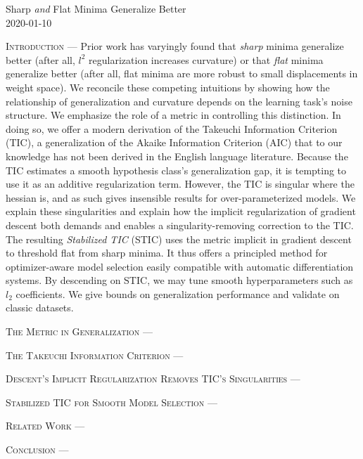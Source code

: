 \documentclass{article}
\begin{document}
    \begin{center}
        \Large
        Sharp \emph{and} Flat Minima Generalize Better
        \\
        \large
        2020-01-10
    \end{center}

    \textsc{Introduction} ---
    Prior work has varyingly found that \emph{sharp} minima generalize better
    (after all, $l^2$ regularization increases curvature) or that \emph{flat}
    minima generalize better (after all, flat minima are more robust to small
    displacements in weight space).  We reconcile these competing intuitions by
    showing how the relationship of generalization and curvature depends on the
    learning task's noise structure.  We emphasize the role of a metric in
    controlling this distinction.  In doing so, we offer a modern derivation of
    the Takeuchi Information Criterion (TIC), a generalization of the Akaike
    Information Criterion (AIC) that to our knowledge has not been derived in
    the English language literature.  Because the TIC estimates a smooth
    hypothesis class's generalization gap, it is tempting to use it as an
    additive regularization term.  However, the TIC is singular where the
    hessian is, and as such gives insensible results for over-parameterized
    models.  We explain these singularities and explain how the implicit
    regularization of gradient descent both demands and enables a
    singularity-removing correction to the TIC.  The resulting \emph{Stabilized
    TIC} (STIC) uses the metric implicit in gradient descent to threshold flat
    from sharp minima.  It thus offers a principled method for optimizer-aware
    model selection easily compatible with automatic differentiation systems.
    By descending on STIC, we may tune smooth hyperparameters such as $l_2$
    coefficients.  We give bounds on generalization performance and validate on
    classic datasets.  

    \textsc{The Metric in Generalization} ---
    
    \textsc{The Takeuchi Information Criterion} ---
    
    \textsc{Descent's Implicit Regularization Removes TIC's Singularities} ---
    
    \textsc{Stabilized TIC for Smooth Model Selection} ---

    \textsc{Related Work} ---

    \textsc{Conclusion} ---
\end{document}
